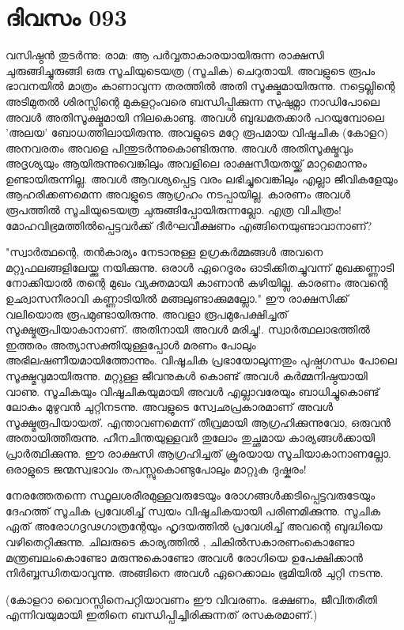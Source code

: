 \newpage
\section{ദിവസം 093}


വസിഷ്ഠന്‍ തുടര്‍ന്നു: രാമ: ആ പര്‍വ്വതാകാരയായിരുന്ന രാക്ഷസി ചുരുങ്ങിച്ചുരുങ്ങി ഒരു സൂചിയുടെയത്ര (സൂചിക) ചെറുതായി. അവളുടെ രൂപം ഭാവനയില്‍ മാത്രം കാണാവുന്ന തരത്തില്‍ അതി സൂക്ഷ്മമായിരുന്നു. നട്ടെല്ലിന്റെ അടിമുതല്‍ ശിരസ്സിന്റെ മുകളറ്റംവരെ ബന്ധിപ്പിക്കുന്ന സുഷുമ്നാ നാഡിപോലെ അവള്‍ അതിസൂക്ഷ്മമായി നിലകൊണ്ടു. അവള്‍ ബുദ്ധമതക്കാര്‍ പറയുമ്പോലെ 'അലയ' ബോധത്തിലായിരുന്നു. അവളുടെ മറ്റേ രൂപമായ വിഷൂചിക (കോളറ) അനവരതം അവളെ പിന്തുടര്‍ന്നുകൊണ്ടിരുന്നു. അവള്‍ അതിസൂക്ഷ്മവും അദൃശ്യയും ആയിരുന്നുവെങ്കിലും അവളിലെ രാക്ഷസീയതയ്ക്ക്‌ മാറ്റമൊന്നും ഉണ്ടായിരുന്നില്ല. അവള്‍ ആവശ്യപ്പെട്ട വരം ലഭിച്ചുവെങ്കിലും എല്ലാ ജീവികളേയും ആഹരിക്കണമെന്ന അവളുടെ ആഗ്രഹം നടപ്പായില്ല. കാരണം അവള്‍ രൂപത്തില്‍ സൂചിയുടെയത്ര ചുരുങ്ങിപ്പോയിരുന്നല്ലോ. എത്ര വിചിത്രം! മോഹവിഭ്രമത്തില്‍പ്പെട്ടവര്‍ക്ക്‌ ദീര്‍ഘവീക്ഷണം എങ്ങിനെയുണ്ടാവാനാണ്‌?

"സ്വാര്‍ത്ഥന്റെ, തന്‍കാര്യം നേടാനുള്ള ഉഗ്രകര്‍മ്മങ്ങള്‍ അവനെ മറ്റുഫലങ്ങളിലേയ്ക്കു നയിക്കുന്നു. ഒരാള്‍ ഏറെദൂരം ഓടിക്കിതച്ചുവന്ന് മുഖക്കണ്ണാടി നോക്കിയാല്‍ തന്റെ മുഖം വ്യക്തമായി കാണാന്‍ കഴിയില്ല. കാരണം അവന്റെ ഉഛ്വാസനീരാവി കണ്ണാടിയില്‍ മങ്ങലുണ്ടാക്കുമല്ലോ." ഈ രാക്ഷസിക്ക്‌ വലിയൊരു രൂപമുണ്ടായിരുന്നു. അവളാ രൂപമുപേക്ഷിച്ചത്‌ സൂക്ഷ്മരൂപിയാകാനാണ്‌. അതിനായി അവള്‍ മരിച്ചു!. സ്വാര്‍ത്ഥലാഭത്തില്‍ ഇത്തരം അത്യാസക്തിയുള്ളപ്പോള്‍ മരണം പോലും അഭിലഷണീയമായിത്തോന്നും. വിഷൂചിക പ്രഭായോലുന്നതും പുഷ്പഗന്ധം പോലെ സൂക്ഷ്മവുമായിരുന്നു. മറ്റുള്ള ജീവനുകള്‍ കൊണ്ട്‌ അവള്‍ കര്‍മ്മനിഷ്ഠയായി വാണു. സൂചികയും വിഷൂചികയുമായി അവള്‍ എല്ലാവരേയും ബാധിച്ചുകൊണ്ട്‌ ലോകം മുഴുവന്‍ ചുറ്റിനടന്നു. അവളുടെ സ്വേഛപ്രകാരമാണ്‌ അവള്‍ സൂക്ഷ്മരൂപിയായത്‌. എന്താവണമെന്ന് തീവ്രമായി ആഗ്രഹിക്കുന്നുവോ, ഒരുവന്‍ അതായിത്തീരുന്നു. ഹീനചിന്തയുള്ളവര്‍ തുലോം തുച്ഛമായ കാര്യങ്ങള്‍ക്കായി പ്രാര്‍ത്ഥിക്കുന്നു. ഈ രാക്ഷസി ആഗ്രഹിച്ചത്‌ ക്രൂരയായ സൂചിയാകാനാണല്ലോ. ഒരാളുടെ ജന്മസ്വഭാവം തപസ്സുകൊണ്ടുപോലും മാറ്റുക ദുഷ്കരം!

നേരത്തേതന്നെ സ്ഥൂലശരീരമുള്ളവരുടേയും രോഗങ്ങള്‍ക്കടിപ്പെട്ടവരുടേയും ദേഹത്ത്‌ സൂചിക പ്രവേശിച്ച്‌ സ്വയം വിഷൂചികയായി പരിണമിക്കുന്നു. സൂചിക ഏത്‌ അരോഗദൃഢഗാത്രന്റേയും ഹൃദയത്തില്‍ പ്രവേശിച്ച്‌ അവന്റെ ബുദ്ധിയെ വഴിതെറ്റിക്കുന്നു. ചിലരുടെ കാര്യത്തില്‍ , ചികില്‍സകാരണംകൊണ്ടോ മന്ത്രബലംകൊണ്ടോ മരുന്നുകൊണ്ടോ അവള്‍ രോഗിയെ ഉപേക്ഷിക്കാന്‍ നിര്‍ബ്ബന്ധിതയാവുന്നു. അങ്ങിനെ അവള്‍ ഏറെക്കാലം ഭൂമിയില്‍ ചുറ്റി നടന്നു.

(കോളറാ വൈറസ്സിനെപറ്റിയാവണം ഈ വിവരണം. ഭക്ഷണം, ജീവിതരീതി എന്നിവയുമായി ഇതിനെ ബന്ധിപ്പിച്ചിരിക്കുന്നത്‌ രസകരമാണ്‌.)
